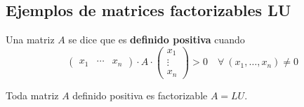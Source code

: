     \subsection{Ejemplos de matrices factorizables LU}
    \begin{defin}
        Una matriz $A$ se dice que es \textbf{definido positiva} cuando 
        $$\begin{pmatrix}
            x_1 & \cdots & x_n
        \end{pmatrix}\cdot A \cdot \begin{pmatrix}
            x_1 \\ \vdots \\ x_n
        \end{pmatrix} > 0 \quad \forall \: (x_1,\ldots, x_n) \neq 0$$
    \end{defin}
    \begin{prop}
        Toda matriz $A$ definido positiva es factorizable $A=LU$.
    \end{prop}
